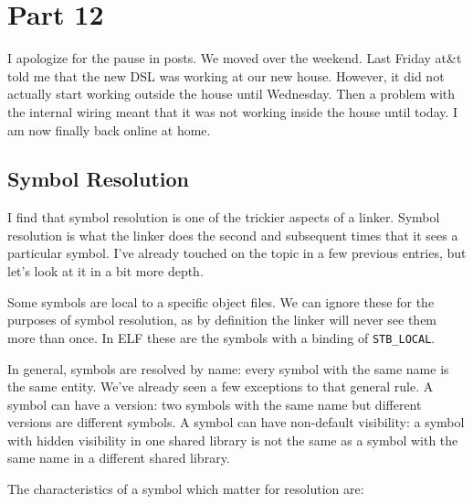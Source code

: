 \section{Part 12}

I apologize for the pause in posts. We moved over the weekend. Last Friday
at\&t told me that the new DSL was working at our new house. However, it did
not actually start working outside the house until Wednesday. Then a problem
with the internal wiring meant that it was not working inside the house until
today. I am now finally back online at home.

\subsection{Symbol Resolution}

I find that symbol resolution is one of the trickier aspects of a linker.
Symbol resolution is what the linker does the second and subsequent times
that it sees a particular symbol. I've already touched on the topic in a few
previous entries, but let's look at it in a bit more depth.

Some symbols are local to a specific object files. We can ignore these for
the purposes of symbol resolution, as by definition the linker will never
see them more than once. In ELF these are the symbols with a binding of
\texttt{STB\_LOCAL}.

In general, symbols are resolved by name: every symbol with the same name is
the same entity. We've already seen a few exceptions to that general rule.
A symbol can have a version: two symbols with the same name but different
versions are different symbols. A symbol can have non-default visibility: a
symbol with hidden visibility in one shared library is not the same as a symbol
with the same name in a different shared library.

The characteristics of a symbol which matter for resolution are:

